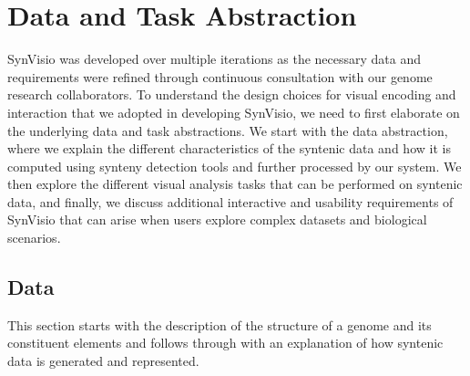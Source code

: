 \chapter{Data and Task Abstraction}

SynVisio was developed over multiple iterations as the necessary data and requirements were refined through continuous consultation with our genome research collaborators. To understand the design choices for visual encoding and interaction that we adopted in developing SynVisio, we need to first elaborate on the underlying data and task abstractions. We start with the data abstraction, where we explain the different characteristics of the syntenic data and how it is computed using synteny detection tools and further processed by our system. We then explore the different visual analysis tasks that can be performed on syntenic data, and finally, we discuss additional interactive and usability requirements of SynVisio that can arise when users explore complex datasets and biological scenarios.

\section{Data}
This section starts with the description of the structure of a genome and its constituent elements and follows through with an explanation of how syntenic data is generated and represented.

